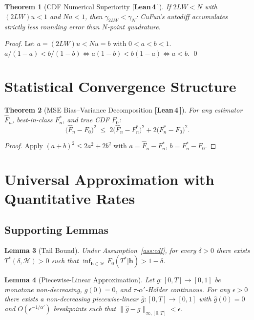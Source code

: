 \documentclass[11pt]{article}
\newtheorem{theorem}{Theorem}[section]
\newtheorem{lemma}[theorem]{Lemma}
\theoremstyle{remark}
\newcommand{\verified}{%
  \textcolor{green!60!black}{\textbf{[Lean\,4\,\checkmark]}}}
\newcommand{\cH}{\mathcal{H}}
\newcommand{\hhat}{\boldsymbol{h}}
\begin{document}
\begin{theorem}[CDF Numerical Superiority \verified{}]
\label{thm:numerical}
If $2LW < N$ with $(2LW)u < 1$ and $Nu < 1$, then
$\gamma_{2LW} < \gamma_N$:
CuFun's autodiff accumulates strictly less rounding error than
$N$-point quadrature.
\end{theorem}

\begin{proof}
Let $a = (2LW)u < Nu = b$ with $0 < a < b < 1$.
$a/(1-a) < b/(1-b) \iff a(1-b) < b(1-a) \iff a < b$. \qed
\end{proof}

\section{Statistical Convergence Structure}

\begin{theorem}[MSE Bias--Variance Decomposition \verified{}]
\label{thm:mse}
For any estimator $\hat{F}_n$, best-in-class $F_n^*$, and true CDF $F_0$:
\[
  \bigl(\hat{F}_n - F_0\bigr)^2
  \;\leq\;
  2\bigl(\hat{F}_n - F_n^*\bigr)^2 + 2\bigl(F_n^* - F_0\bigr)^2.
\]
\end{theorem}

\begin{proof}
Apply $(a+b)^2 \leq 2a^2 + 2b^2$ with $a = \hat{F}_n - F_n^*$,
$b = F_n^* - F_0$.
\end{proof}

\section{Universal Approximation with Quantitative Rates}
\label{sec:ua}

\subsection{Supporting Lemmas}

\begin{lemma}[Tail Bound]
\label{lem:tail}
Under Assumption~\ref{ass:cdf}, for every $\delta > 0$ there exists
$T^*(\delta,\cH) > 0$ such that
$\inf_{\hhat \in \cH} F_0(T^*|\hhat) > 1 - \delta$.
\end{lemma}

\begin{lemma}[Piecewise-Linear Approximation]
\label{lem:pwl}
Let $g : [0,T] \to [0,1]$ be monotone non-decreasing,
$g(0) = 0$, and $\tau$-$\alpha'$-H\"{o}lder continuous.
For any $\epsilon > 0$ there exists a non-decreasing piecewise-linear
$\hat{g} : [0,T] \to [0,1]$ with $\hat{g}(0)=0$ and
$O(\epsilon^{-1/\alpha'})$ breakpoints such that
$\|\hat{g} - g\|_{\infty,[0,T]} < \epsilon$.
\end{lemma}
\end{document}
